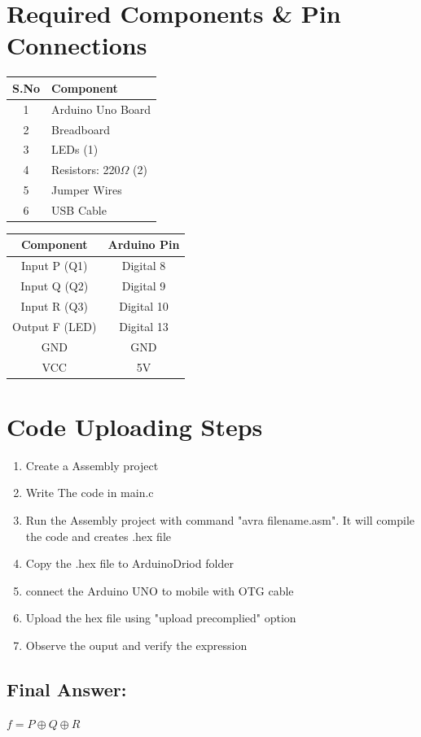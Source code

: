 \documentclass[a4paper,12pt]{article}
\begin{document}
\section*{Required Components \& Pin Connections}
\begin{center}
\begin{minipage}{0.45\textwidth}
\begin{table}[H]
\centering
\begin{tabular}{|c|l|}
\hline
\textbf{S.No} & \textbf{Component} \\ \hline
1 & Arduino Uno Board \\
2 & Breadboard \\
3 & LEDs (1) \\
4 & Resistors: 220$\Omega$ (2) \\
5 & Jumper Wires \\
6 & USB Cable \\
\hline
\end{tabular}
\end{table}
\end{minipage}
\hspace{0.05\textwidth}
\begin{minipage}{0.45\textwidth}
\begin{table}[H]
\centering
\begin{tabular}{|c|c|}
\hline
\textbf{Component} & \textbf{Arduino Pin} \\ \hline
Input P (Q1) & Digital 8 \\
Input Q (Q2) & Digital 9 \\
Input R (Q3) & Digital 10 \\
Output F (LED) & Digital 13 \\ 
GND & GND \\
VCC & 5V \\
\hline
\end{tabular}
\end{table}
\end{minipage}
\end{center}
\newpage
\section*{Code Uploading Steps}
\begin{enumerate}
	\item Create a Assembly  project
	\item Write The code in main.c
	\item Run the Assembly project with command "avra filename.asm". It will compile the code and creates .hex file
	\item Copy the .hex file to ArduinoDriod folder
	\item connect the Arduino UNO to mobile with OTG cable
	\item Upload the hex file using "upload precomplied" option
	\item Observe the ouput and verify the expression
\end{enumerate}
\subsection*{Final Answer:}

$
\boxed{f = P \oplus Q \oplus R}
$
\end{document}
